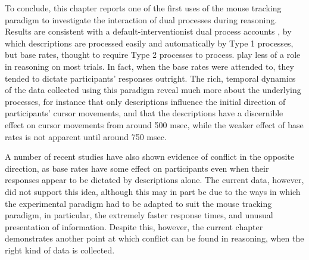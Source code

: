 To conclude, this chapter reports one of the first uses of
the mouse tracking paradigm to investigate the interaction of
dual processes during reasoning.
Results are consistent with a default-interventionist
dual process accounts \citep{Evans2006,Kahneman2002,Evans2013a},
by which descriptions are processed easily and automatically
by Type 1 processes,
but base rates, thought to require Type 2 processes to process.
play less of a role in reasoning on most trials.
In fact, when the base rates were attended to,
they tended to dictate participants' responses outright.
The rich, temporal dynamics of the data collected
using this paradigm reveal much more about the underlying processes,
for instance that only descriptions influence
the initial direction of participants' cursor movements,
and that the descriptions have a discernible effect on cursor movements
from around 500 msec, while the weaker effect of base rates
is not apparent until around 750 msec.

A number of recent studies have also shown evidence
of conflict in the opposite direction,
as base rates have some effect on participants
even when their responses appear to be dictated by descriptions alone.
The current data, however, did not support this idea,
although this may in part be due to the ways in which
the experimental paradigm had to be adapted
to suit the mouse tracking paradigm,
in particular, the extremely faster response times,
and unusual presentation of information.
Despite this, however, the current chapter demonstrates 
another point at which conflict can be found in reasoning,
when the right kind of data is collected.











